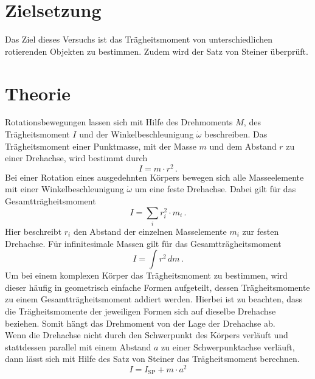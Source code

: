 \nocite{anleitungV101}
\section{Zielsetzung}
\label{sec:Zielsetzung}
Das Ziel dieses Versuchs ist das Trägheitsmoment von unterschiedlichen rotierenden Objekten zu bestimmen. 
Zudem wird der Satz von Steiner überprüft.
%
\section{Theorie}
\label{sec:Theorie}
Rotationsbewegungen lassen sich mit Hilfe des Drehmoments $M$, des Trägheitsmoment $I$ und 
der Winkelbeschleunigung $\dot{\omega}$ beschreiben. Das Trägheitsmoment einer Punktmasse, 
mit der Masse $m$ und dem Abstand $r$ zu einer Drehachse, wird bestimmt durch
\begin{equation}
    I = m \cdot r^{2}\,.
    \label{eqn:TragheitPunktmasse}
\end{equation}
%
Bei einer Rotation eines ausgedehnten Körpers bewegen sich alle Masseelemente mit einer 
Winkelbeschleunigung $\dot{\omega}$ um eine feste Drehachse. Dabei gilt für das Gesamtträgheitsmoment
\begin{equation}
    I = \sum_{i} r_{i}^{2} \cdot m_{i}\,.
    \label{eqn:GesamttragheitSumme}
\end{equation}
%
Hier beschreibt $r_{i}$ den Abstand der einzelnen Masselemente $m_{i}$ zur festen Drehachse.
Für infinitesimale Massen gilt für das Gesamtträgheitsmoment
\begin{equation}
    I = \int r^{2}\,dm \,.
    \label{eqn:GesamttragheitIntegral}
\end{equation}
%
Um bei einem komplexen Körper das Trägheitsmoment zu bestimmen, wird dieser häufig in 
geometrisch einfache Formen aufgeteilt, dessen Trägheitsmomente zu einem Gesamtträgheitsmoment 
addiert werden. Hierbei ist zu beachten, dass die Trägheitsmomente der jeweiligen Formen sich
auf dieselbe Drehachse beziehen. Somit hängt das Drehmoment von der Lage der Drehachse ab. \\
%
Wenn die Drehachse nicht durch den Schwerpunkt des Körpers verläuft und stattdessen parallel 
mit einem Abstand $a$ zu einer Schwerpunktachse verläuft, dann lässt sich mit Hilfe des Satz von Steiner
das Trägheitsmoment berechnen.
\begin{equation}
    I = I_{\text{SP}} + m \cdot a^{2}
    \label{eqn:SatzVonSteiner}
\end{equation}

